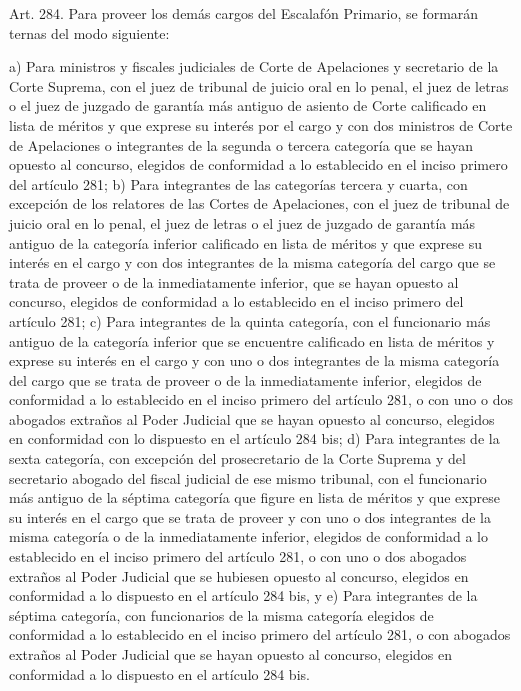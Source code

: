     Art. 284. Para proveer los demás cargos del Escalafón Primario, se formarán ternas del modo siguiente:

    a) Para ministros y fiscales judiciales de Corte de Apelaciones y secretario de la Corte Suprema, con el juez de tribunal de juicio oral en lo penal, el juez de letras o el juez de juzgado de garantía más antiguo de asiento de Corte calificado en lista de méritos y que exprese su interés por el cargo y con dos ministros de Corte de Apelaciones o integrantes de la segunda o tercera categoría que se hayan opuesto al concurso, elegidos de conformidad a lo establecido en el inciso primero del artículo 281;
    b) Para integrantes de las categorías tercera y cuarta, con excepción de los relatores de las Cortes de Apelaciones, con el juez de tribunal de juicio oral en lo penal, el juez de letras o el juez de juzgado de garantía más antiguo de la categoría inferior calificado en lista de méritos y que exprese su interés en el cargo y con dos integrantes de la misma categoría del cargo que se trata de proveer o de la inmediatamente inferior, que se hayan opuesto al concurso, elegidos de conformidad a lo establecido en el inciso primero del artículo 281;
    c) Para integrantes de la quinta categoría, con el funcionario más antiguo de la categoría inferior que se encuentre calificado en lista de méritos y exprese su interés en el cargo y con uno o dos integrantes de la misma categoría del cargo que se trata de proveer o de la inmediatamente inferior, elegidos de conformidad a lo establecido en el inciso primero del artículo 281, o con uno o dos abogados extraños al Poder Judicial que se hayan opuesto al concurso, elegidos en conformidad con lo dispuesto en el artículo 284 bis;
    d) Para integrantes de la sexta categoría, con excepción del prosecretario de la Corte Suprema y del secretario abogado del fiscal judicial de ese mismo tribunal, con el funcionario más antiguo de la séptima categoría que figure en lista de méritos y que exprese su interés en el cargo que se trata de proveer y con uno o dos integrantes de la misma categoría o de la inmediatamente inferior, elegidos de conformidad a lo establecido en el inciso primero del artículo 281, o con uno o dos abogados extraños al Poder Judicial que se hubiesen opuesto al concurso, elegidos en conformidad a lo dispuesto en el artículo 284 bis, y
    e) Para integrantes de la séptima categoría, con funcionarios de la misma categoría elegidos de conformidad a lo establecido en el inciso primero del artículo 281, o con abogados extraños al Poder Judicial que se hayan opuesto al concurso, elegidos en conformidad a lo dispuesto en el artículo 284 bis.
